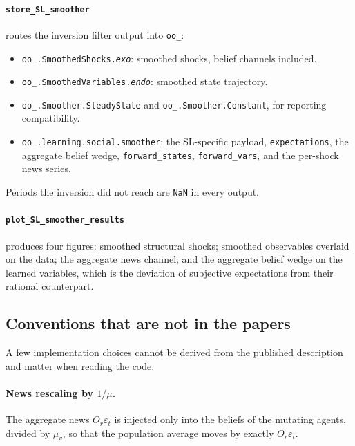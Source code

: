 \documentclass[11pt,a4paper]{article}
\newcommand{\field}[1]{\texttt{#1}}
\begin{document}
\paragraph{\texttt{store\_SL\_smoother}} routes the inversion filter output
into \field{oo\_}:

\begin{itemize}[leftmargin=2em]
\item \field{oo\_.SmoothedShocks.\textit{exo}}: smoothed shocks, belief
      channels included.
\item \field{oo\_.SmoothedVariables.\textit{endo}}: smoothed state
      trajectory.
\item \field{oo\_.Smoother.SteadyState} and \field{oo\_.Smoother.Constant}, for
      reporting compatibility.
\item \field{oo\_.learning.social.smoother}: the SL-specific payload,
      \field{expectations}, the aggregate belief
      wedge, \field{forward\_states}, \field{forward\_vars}, and the per-shock news series.
\end{itemize}

Periods the inversion did not reach are \texttt{NaN} in every output.

\paragraph{\texttt{plot\_SL\_smoother\_results}} produces four figures:
smoothed structural shocks; smoothed observables overlaid on the data;
the aggregate news channel; and the aggregate belief wedge on the learned
variables, which is the deviation of subjective expectations from their
rational counterpart.

\subsection{Conventions that are not in the papers}
\label{sec:simulation:conventions}

A few implementation choices cannot be derived from the published description
and matter when reading the code.

\paragraph{News rescaling by $1/\mu$.} The aggregate news $O_r\varepsilon_t$ is
injected only into the beliefs of the mutating agents, divided by $\mu_v$, so
that the population average moves by exactly $O_r\varepsilon_t$. 
\end{document}
